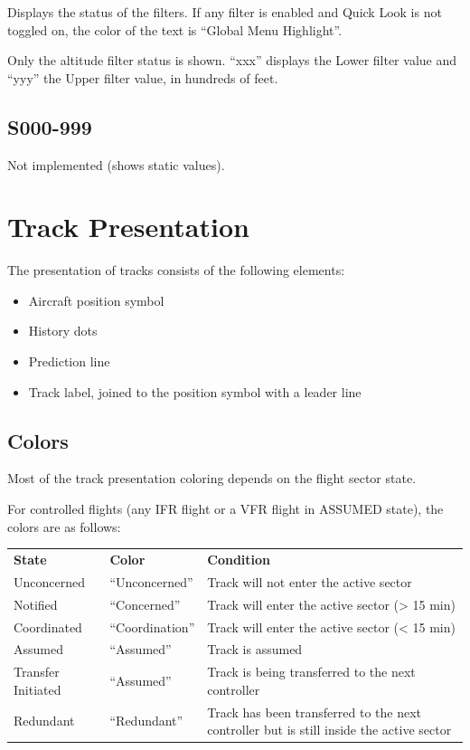 \documentclass[11pt,a4paper,oldfontcommands]{memoir}
\begin{document}
Displays the status of the filters. If any filter is enabled and Quick Look is not toggled on, the color of the
text is “Global Menu Highlight”.

Only the altitude filter status is shown. “xxx” displays the Lower filter value and “yyy” the Upper filter
value, in hundreds of feet.

\subsection{S000-999}
Not implemented (shows static values).

\section{Track Presentation}

The presentation of tracks consists of the following elements:

\begin{itemize}
    \item{Aircraft position symbol}
    \item{History dots}
    \item{Prediction line}
    \item{Track label, joined to the position symbol with a leader line}
\end{itemize}

\subsection{Colors}

Most of the track presentation coloring depends on the flight sector state.

For controlled flights (any IFR flight or a VFR flight in ASSUMED state), the colors are as follows:\\

\begin{tabular}{l l l}
\textbf{State}          & \textbf{Color}    & \textbf{Condition}
\\Unconcerned           & “Unconcerned”     & Track will not enter the active sector
\\Notified              & “Concerned”       & Track will enter the active sector (> 15 min)
\\Coordinated           & “Coordination”    & Track will enter the active sector (< 15 min)
\\Assumed               & “Assumed”         & Track is assumed
\\Transfer Initiated    & “Assumed”         & Track is being transferred to the next controller
\\Redundant             & “Redundant”       & Track has been transferred to the next controller but is still inside the active sector
\end{tabular}
\end{document}
